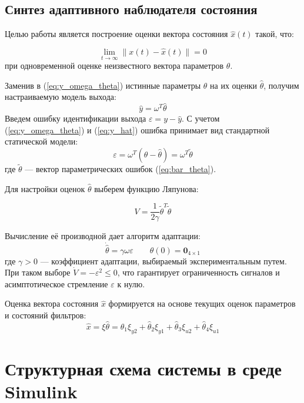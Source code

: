 \documentclass[a4paper,12pt]{article}
\begin{document}
\subsection{Синтез адаптивного наблюдателя состояния}
Целью работы является построение оценки вектора состояния $\hat{x}(t)$ такой, что:

\[\lim_{t\to\infty} \|x(t) - \hat{x}(t)\| = 0\] 
при одновременной оценке неизвестного вектора параметров $\theta$.

Заменив в (\ref{eq:y_omega_theta}) истинные параметры $\theta$ на их оценки $\hat{\theta}$, получим настраиваемую модель выхода:
\begin{equation}
	\hat{y} = \omega^T \hat{\theta}
	\label{eq:y_hat}
\end{equation}
Введем ошибку идентификации выхода $\varepsilon = y - \hat{y}$. С учетом (\ref{eq:y_omega_theta}) и (\ref{eq:y_hat}) ошибка принимает вид стандартной статической модели:
\begin{equation}
	\varepsilon = \omega^T (\theta - \hat{\theta}) = \omega^T \tilde{\theta}
	\label{eq:epsilon}
\end{equation}
где $\tilde{\theta}$ --- вектор параметрических ошибок (\ref{eq:bar_theta}).

Для настройки оценок $\hat{\theta}$ выберем функцию Ляпунова: 

\[V = \frac{1}{2\gamma} \tilde{\theta}^T \tilde{\theta}\]

 Вычисление её производной дает алгоритм адаптации:
\begin{equation}
	\dot{\hat{\theta}} = \gamma \omega \varepsilon \qquad \hat{\theta}(0) = \mathbf{0}_{4 \times 1}
	\label{eq:adapt_law}
\end{equation}
где $\gamma > 0$ --- коэффициент адаптации, выбираемый экспериментальным путем. При таком выборе $\dot{V} = -\varepsilon^2 \leq 0$, что гарантирует ограниченность сигналов и асимптотическое стремление $\varepsilon$ к нулю.

Оценка вектора состояния $\hat{x}$ формируется на основе текущих оценок параметров и состояний фильтров:
\begin{equation}
	\hat{x} = \xi \hat{\theta} = \hat{\theta}_1 \xi_{y2} + \hat{\theta}_2 \xi_{y1} + \hat{\theta}_3 \xi_{u2} + \hat{\theta}_4 \xi_{u1}
	\label{eq:x_hat}
\end{equation}


\newpage
\section{Структурная схема системы в среде Simulink}
\end{document}
